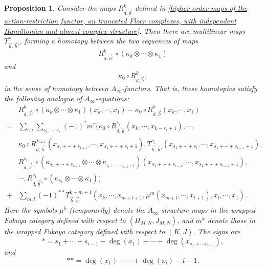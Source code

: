 \documentclass{amsart}
\newtheorem{proposition}[theorem]{Proposition}
\numberwithin{equation}{section}
\numberwithin{figure}{section}
\begin{document}
\begin{proposition}\label{compatibility of action-restriction maps with inclusions}
	Consider the maps $R_{d, \vec{b}}^{k}$ defined in \eqref{higher order maps of the action-restriction functor, on truncated Floer complexes, with independent Hamiltonian and almost complex structure}. Then there are multilinear maps $T_{\vec{b}, \vec{b}'}^{k}$, forming a homotopy between the two sequences of maps 
\begin{equation*}
R_{d, \vec{b}'}^{k} \circ (\kappa_{k} \otimes \cdots \otimes \kappa_{1})
\end{equation*}
and
\begin{equation*}
\kappa_{0} \circ R_{d, \vec{b}}^{k},
\end{equation*}
in the sense of homotopy between $A_{\infty}$-functors. That is, these homotopies satisfy the following analogue of $A_{\infty}$-equations:
\begin{equation}
\begin{split}
& R_{d, \vec{b}'}^{k} \circ (\kappa_{k} \otimes \cdots \otimes \kappa_{1})(x_{k}, \cdots, x_{1}) - \kappa_{0} \circ R_{d, \vec{b}}^{k}(x_{k}, \cdots, x_{1}) \\
= & \sum_{r, i} \sum_{s_{1}, \cdots, s_{r}} (-1)^{*} 
m^{r}(\kappa_{0} \circ R_{d, \vec{b}}^{s_{r}}(x_{k}, \cdots, x_{k-s_{r}+1}), \cdots,\\
& \kappa_{0} \circ R_{d, \vec{b}}^{s_{i+1}}(x_{s_{1} + \cdots + s_{i+1}}, \cdots, x_{s_{1} + \cdots + s_{i} + 1}), 
T_{\vec{b}, \vec{b}'}^{s_{i}}(x_{s_{1} + \cdots + s_{i}}, \cdots, x_{s_{1} + \cdots + s_{i-1} + 1}),\\
& R_{d, \vec{b}'}^{s_{i}} \circ (\kappa_{s_{1} + \cdots + s_{i-1}} \otimes \cdots \otimes \kappa_{_{s_{1} + \cdots + s_{i-2} + 1}})(x_{s_{1} + \cdots + s_{i-1}}, \cdots, x_{s_{1} + \cdots + s_{i-2} + 1}),\\
& \cdots, R_{d, \vec{b}'}^{s_{1}} \circ (\kappa_{s_{1}} \otimes \cdots \otimes \kappa_{1})) \\
+ & \sum_{m, l} (-1)^{**} T_{\vec{b}, \vec{b}'}^{k-m+1}(x_{k}, \cdots, x_{m+l+1}, \mu^{m}(x_{m+l}, \cdots, x_{l+1}), x_{l}, \cdots, x_{1}).
\end{split}
\end{equation}
Here the symbols $\mu^{k}$ (temporarily) denote the $A_{\infty}$-structure maps in the wrapped Fukaya category defined with respect to $(H_{M, N}, J_{M, N})$, and $m^{k}$ denote those in the wrapped Fukaya category defined with respect to $(K, J)$. The signs are
\begin{equation*}
* = s_{1} + \cdots + s_{i-1} - \deg(x_{1}) - \cdots - \deg(x_{s_{1} + \cdots s_{i-1}}),
\end{equation*}
and
\begin{equation*}
** = \deg(x_{1}) + \cdots + \deg(x_{l}) - l - 1.
\end{equation*}
\end{proposition}
\end{document}
